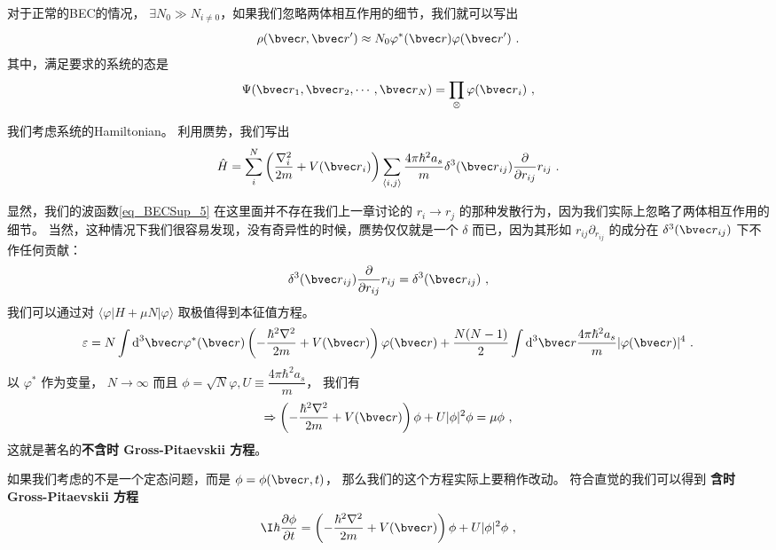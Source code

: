 对于正常的BEC的情况， $\exists N_0\gg N_{i\neq0}$，如果我们忽略两体相互作用的细节，我们就可以写出
\begin{equation}
\rho({\bvec r,\bvec r'}) \approx N_0\varphi^*({\bvec r})\varphi({\bvec r'})~.
\end{equation}
其中，满足要求的系统的态是
\begin{equation}\label{eq_BECSup_5}
\Psi({\bvec r}_1,{\bvec r}_2,\cdots,{\bvec r}_N) = \prod_{\otimes}\varphi({\bvec r}_i)~,
\end{equation}


我们考虑系统的Hamiltonian。 利用赝势，我们写出
\begin{equation}
\hat{H} = \sum_i^N \left(\frac{\nabla_i^2}{2m}+V({\bvec r}_i)\right)\sum_{\langle i,j\rangle}\frac{4\pi\hbar^2 a_s}{m}\delta^3({\bvec r}_{ij})\frac{\partial}{\partial r_{ij}}r_{ij}~.
\end{equation}


显然，我们的波函数\autoref{eq_BECSup_5} 在这里面并不存在我们上一章讨论的 $r_i\to r_j$ 的那种发散行为，因为我们实际上忽略了两体相互作用的细节。 当然，这种情况下我们很容易发现，没有奇异性的时候，赝势仅仅就是一个 $\delta$ 而已，因为其形如 $r_{ij}\partial_{r_{ij}}$ 的成分在 $\delta^3({\bvec r}_{ij})$ 下不作任何贡献：
\begin{equation}
\delta^3({\bvec r}_{ij})\frac{\partial}{\partial r_{ij}}r_{ij} = \delta^3({\bvec r}_{ij})~,
\end{equation}
我们可以通过对 $\langle \varphi|H+\mu N|\varphi\rangle$ 取极值得到本征值方程。
\begin{equation}
\varepsilon = N\int \text{d}^3{\bvec r}\varphi^*({\bvec r})\left(-\frac{\hbar^2\nabla^2}{2m}+V({\bvec r})\right)\varphi({\bvec r})+\frac{N(N-1)}{2}\int \text{d}^3{\bvec r}\frac{4\pi\hbar^2a_s}{m}|\varphi({\bvec r})|^4~.
\end{equation}
以 $\varphi^*$ 作为变量， $N\to\infty$ 而且 $\phi = \sqrt{N}\varphi, U\equiv \dfrac{4\pi\hbar^2a_s}{m}$， 我们有
\begin{equation}
\Rightarrow \left(-\frac{\hbar^2\nabla^2}{2m}+V({\bvec r})\right)\phi + U|\phi|^2\phi = \mu\phi~,
\end{equation}
这就是著名的\textbf{不含时 Gross-Pitaevskii 方程}。

如果我们考虑的不是一个定态问题，而是 $\phi = \phi({\bvec r},t)$， 那么我们的这个方程实际上要稍作改动。 符合直觉的我们可以得到 \textbf{含时 Gross-Pitaevskii 方程}
\begin{equation}\label{eq_BECSup_10}
\I\hbar\frac{\partial\phi}{\partial t} = \left(-\frac{\hbar^2\nabla^2}{2m}+V({\bvec r})\right)\phi + U|\phi|^2\phi~,
\end{equation}


